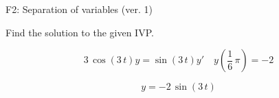 \begin{exercise}
  \begin{exerciseTitle}F2: Separation of variables (ver. 1)\end{exerciseTitle}
  \begin{exerciseStatement}
    
Find the solution to the given IVP.

    
\[3 \, \cos\left(3 \, t\right) y= \sin\left(3 \, t\right) y'\hspace{1em} y\left( \frac{1}{6} \, \pi \right)= -2\]

  \end{exerciseStatement}
  \begin{exerciseAnswer}
    
\[y= -2 \, \sin\left(3 \, t\right)\]

  \end{exerciseAnswer}
\end{exercise}